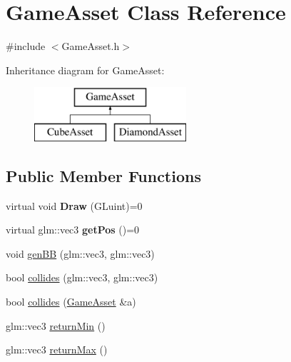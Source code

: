 \hypertarget{classGameAsset}{}\section{Game\+Asset Class Reference}
\label{classGameAsset}


{\ttfamily \#include $<$Game\+Asset.\+h$>$}

Inheritance diagram for Game\+Asset\+:\begin{figure}[H]
\begin{center}
\leavevmode
\includegraphics[height=2.000000cm]{classGameAsset}
\end{center}
\end{figure}
\subsection*{Public Member Functions}
\begin{DoxyCompactItemize}
\item 
virtual void {\bfseries Draw} (G\+Luint)=0\hypertarget{classGameAsset_a961aa51ca0a9961fc584c0b5d5431300}{}\label{classGameAsset_a961aa51ca0a9961fc584c0b5d5431300}

\item 
virtual glm\+::vec3 {\bfseries get\+Pos} ()=0\hypertarget{classGameAsset_a6b3e7c11efd7084e032f23dfd9374672}{}\label{classGameAsset_a6b3e7c11efd7084e032f23dfd9374672}

\item 
void \hyperlink{classGameAsset_af6e148d5c112bd024739ccffcbee603e}{gen\+BB} (glm\+::vec3, glm\+::vec3)
\item 
bool \hyperlink{classGameAsset_a12c7589d38ad0c59588659326e234057}{collides} (glm\+::vec3, glm\+::vec3)
\item 
bool \hyperlink{classGameAsset_a5ad5bb6e7ad41b86f3709a75ecb5bacf}{collides} (\hyperlink{classGameAsset}{Game\+Asset} \&a)
\item 
glm\+::vec3 \hyperlink{classGameAsset_a47ca91c87610d002d63f59563c038af9}{return\+Min} ()
\item 
glm\+::vec3 \hyperlink{classGameAsset_ae2661492933e0678c4c17b0f77083dc9}{return\+Max} ()
\end{DoxyCompactItemize}


